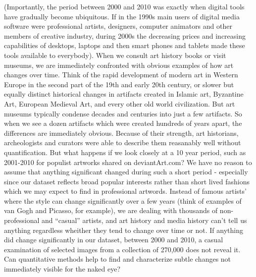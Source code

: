 \documentclass[letterpaper]{article}
\begin{document}
(Importantly, the period between 2000 and 2010 was exactly when digital tools have gradually become ubiquitous. If in the 1990s main users of digital media software were professional artists, designers, computer animators and other members of creative industry, during 2000s the decreasing prices and increasing capabilities of desktops, laptops and then smart phones and tablets made these tools available to everybody).
When we consult art history books or visit museums, we are immediately confronted with obvious examples of how art changes over time. Think of the rapid development of modern art in Western Europe in the second part of the 19th and early 20th century, or slower but equally distinct historical changes in artifacts created in  Islamic art, Byzantine Art, European Medieval Art, and every other old world civilization. But art museums typically condense decades and centuries into just a few artifacts. So when we see a dozen artifacts which were created hundreds of years apart, the differences are immediately obvious. Because of their strength, art historians, archeologists and curators were able to describe them reasanably well without quantification. But what happens if we look closely at a 10 year period, such as 2001-2010 for populist artworks shared on deviantArt.com? We have no reason to assume that anything significant changed during such a short period - especially since our dataset reflects broad popular interests rather than short lived fashions which we may expect to find in professional artwords. Instead of famous artists’ where the style can change significantly over a few years (think of examples of van Gogh and Picasso, for example), we are dealing with thousands of non-professional and “casual” artists, and art history and media history can’t tell us anything regardless wheither they tend to change over time or not. If anything did change significantly in our dataset, between 2000 and 2010, a casual examination of selected images from a collection of 270,000 does not reveal it. Can quantitative methods help to find and characterize subtle changes not immediately visible for the naked eye? 
\end{document}
